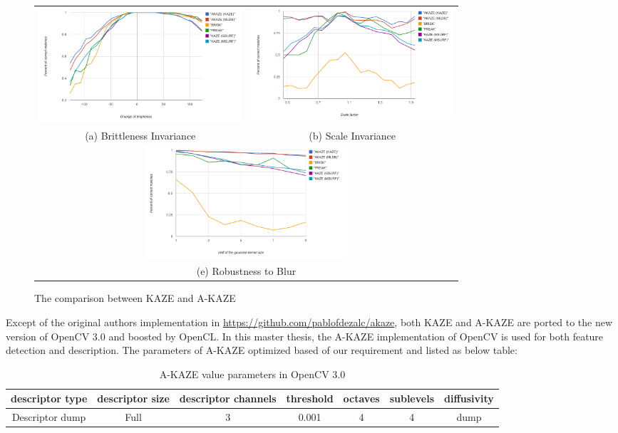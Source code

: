 \begin{figure}[ht]
\begin{tabular}{cc}
  \includegraphics[width=75mm]{figures/brithness_akaze} &  \includegraphics[width=75mm]{figures/scale_akaze} \\
(a) Brittleness Invariance & (b) Scale Invariance \\[6pt]
\multicolumn{2}{c}{\includegraphics[width=75mm]{figures/blur_akaze} }\\
\multicolumn{2}{c}{(e) Robustness to Blur}
\end{tabular}
\caption{The comparison between KAZE and A-KAZE}\label{fig:compare_kaze_and_A-kaze}
\end{figure}

Except of the original authors implementation in \url{https://github.com/pablofdezalc/akaze}, both KAZE and A-KAZE are ported to the new version of OpenCV 3.0 and boosted by OpenCL. In this master thesis, the A-KAZE implementation of OpenCV is used for both feature detection and description. The parameters of A-KAZE optimized based of our requirement and listed as below table:

\begin{table}[ht]
  \caption{A-KAZE value parameters in OpenCV 3.0}
  \begin{tabular}{| c | c | c | c | c | c | c |}
      \hline
      descriptor type & descriptor size & descriptor channels & threshold & octaves & sublevels & diffusivity \\ \hline \hline
      Descriptor dump & Full & 3 & 0.001 & 4 & 4 & dump \\ \hline
  \end{tabular}
\end{table}

